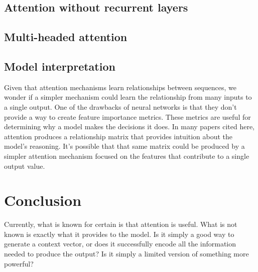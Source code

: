 \documentclass{article}
\begin{document}
\subsection{Attention without recurrent layers}

\cite{attn_all_you_need}

\subsection{Multi-headed attention}\label{section:multi_headed}

\cite{attn_all_you_need}

\subsection{Model interpretation}

Given that attention mechanisms learn relationships between sequences, we wonder if a simpler mechanism could learn the relationship from many inputs to a single output. One of the drawbacks of neural networks is that they don't provide a way to create feature importance metrics. These metrics are useful for determining why a model makes the decisions it does. In many papers cited here, attention produces a relationship matrix that provides intuition about the model's reasoning. It's possible that that same matrix could be produced by a simpler attention mechanism focused on the features that contribute to a single output value.

\section{Conclusion}

Currently, what is known for certain is that attention is useful. What is not known is exactly what it provides to the model. Is it simply a good way to generate a context vector, or does it successfully encode all the information needed to produce the output? Is it simply a limited version of something more powerful?



\end{document}
